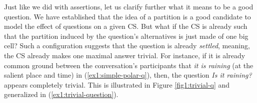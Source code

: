 \begin{exe}
	\label{ex1:question-partition}
	\label{ex1:question-answer}
\end{exe}

Just like we did with assertions, let us clarify further what it means to be a good question. We have established that the idea of a partition is a good candidate to model the effect of questions on a given CS. But what if the CS is already such that the partition induced by the question's alternatives is just made of one big cell? Such a configuration suggests that the question is already \textit{settled}, meaning, the CS already makes one maximal answer trivial. For instance, if it is already common ground between the conversation's participants that \textit{it is raining} (at the salient place and time) in (\ref{ex1:simple-polar-q}), then, the question \textit{Is it raining?} appears completely trivial. This is illustrated in Figure \ref{fig1:trivial-q} and generalized in (\ref{ex1:trivial-question}).



